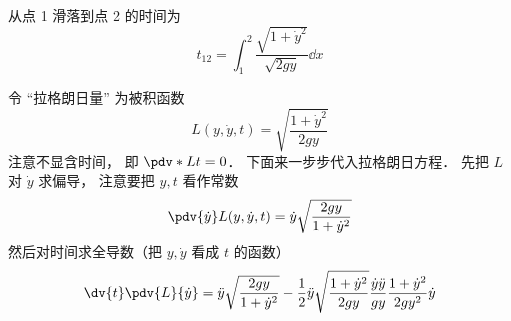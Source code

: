 

从点 1 滑落到点 2 的时间为
\begin{equation}
t_{12} = \int_1^2 \frac{\sqrt{1+\dot{y}^2}}{\sqrt{2gy}} \dd{x}
\end{equation}

令 “拉格朗日量” 为被积函数
\begin{equation}
L(y, \dot{y}, t) = \sqrt{\frac{1 + \dot{y}^2}{2gy}}
\end{equation}
注意不显含时间， 即 $\pdv*{L}{t} = 0$． 下面来一步步代入拉格朗日方程． 先把 $L$ 对 $\dot{y}$ 求偏导， 注意要把 $y, t$ 看作常数
\begin{equation}
\pdv{\dot{y}}L(y, \dot{y}, t) = \dot y\sqrt{\frac{2gy}{1+\dot{y}^2}}
\end{equation}
然后对时间求全导数（把 $y, \dot{y}$ 看成 $t$ 的函数）
\begin{equation}
\dv{t}\pdv{L}{\dot{y}} = \ddot{y}\sqrt{\frac{2gy}{1+\dot{y}^2}} - \frac{1}{2}\ddot{y}\sqrt{\frac{1+\dot{y}^2}{2gy}}\frac{\dot{y}\ddot{y}}{gy}\frac{1+\dot{y}^2}{2gy^2}\dot y
\end{equation}

